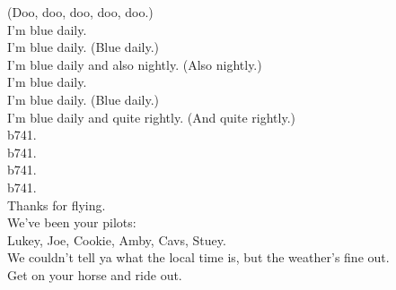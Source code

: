 (Doo, doo, doo, doo, doo.) \\
I'm blue daily. \\
I'm blue daily. (Blue daily.) \\
I'm blue daily and also nightly. (Also nightly.) \\
I'm blue daily. \\
I'm blue daily. (Blue daily.) \\
I'm blue daily and quite rightly. (And quite rightly.) \\

b741. \\
b741. \\
b741. \\
b741. \\
Thanks for flying. \\
We've been your pilots: \\
Lukey, Joe, Cookie, Amby, Cavs, Stuey. \\
We couldn't tell ya what the local time is, but the weather's fine out. \\
Get on your horse and ride out. \\
